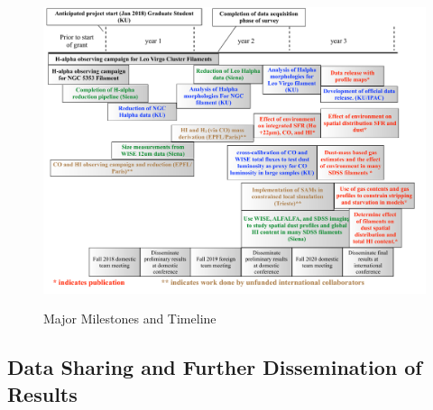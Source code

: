 \documentclass[11pt, preprint]{aastex}
\begin{document}
{%




%
%


\begin{figure}[h]
\caption{Major Milestones and Timeline \label{schedule}}
\includegraphics[width=\textwidth]{work-plan_v2.pdf}
\label{fig:workplan}
\end{figure}

\vspace*{-.8cm}\subsection{Data Sharing and Further Dissemination of Results }
\vspace*{-.3cm}

}
\end{document}
